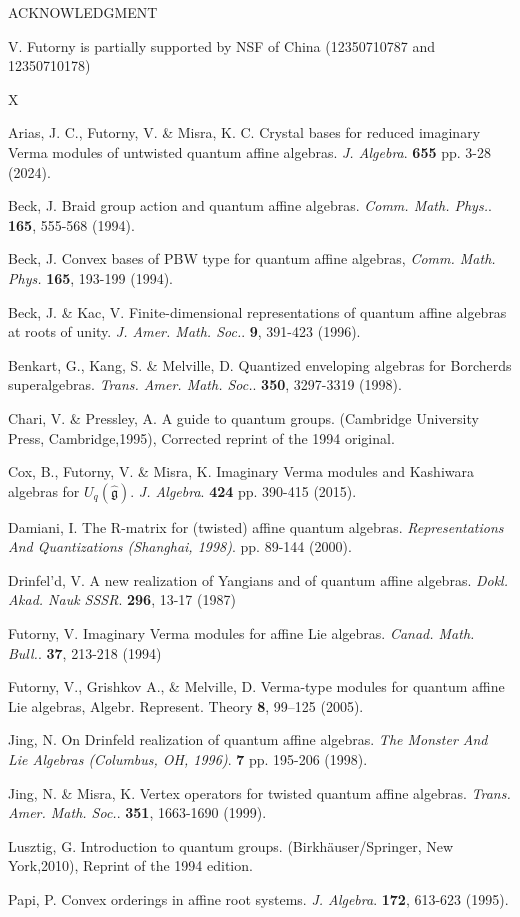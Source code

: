 \documentclass[12pt]{amsart}
\numberwithin{equation}{section}
\begin{document}
\bigskip
\begin{center}
ACKNOWLEDGMENT
\end{center}
\smallskip
 V. Futorny is partially supported by NSF of China (12350710787 and 12350710178)


\begin{thebibliography}{X}

 Arias, J. C., Futorny, V. \& Misra, K. C. Crystal bases for reduced imaginary Verma modules of untwisted quantum affine algebras. {\em J. Algebra}. \textbf{655} pp. 3-28 (2024).

Beck, J. Braid group action and quantum affine algebras. {\em Comm. Math. Phys.}. \textbf{165}, 555-568 (1994).

 Beck, J. Convex bases of PBW type for quantum affine algebras, {\em Comm. Math. Phys.} {\bf 165}, 193-199 (1994).

 Beck, J. \& Kac, V. Finite-dimensional representations of quantum affine algebras at roots of unity. {\em J. Amer. Math. Soc.}. \textbf{9}, 391-423 (1996).

 Benkart, G., Kang, S. \& Melville, D. Quantized enveloping algebras for Borcherds superalgebras. {\em Trans. Amer. Math. Soc.}. \textbf{350}, 3297-3319 (1998).

Chari, V. \& Pressley, A. A guide to quantum groups. (Cambridge University Press, Cambridge,1995), Corrected reprint of the 1994 original.

Cox, B., Futorny, V. \& Misra, K. Imaginary {V}erma modules and {K}ashiwara algebras for  {$U_q(\hat{\mathfrak{g}})$}. {\em J. Algebra}. \textbf{424} pp. 390-415 (2015).

 Damiani, I. The R-matrix for (twisted) affine quantum algebras. {\em Representations And Quantizations (Shanghai, 1998)}. pp. 89-144 (2000).

Drinfel'd, V. A new realization of Yangians and of quantum affine algebras. {\em Dokl. Akad. Nauk SSSR}. \textbf{296}, 13-17 (1987)

Futorny, V. Imaginary Verma modules for affine Lie algebras. {\em Canad. Math. Bull.}. \textbf{37}, 213-218 (1994)

 Futorny, V., Grishkov A., \& Melville, D. Verma-type modules for quantum affine Lie algebras, Algebr. Represent. Theory {\bf 8}, 99--125 (2005).

 Jing, N. On Drinfeld realization of quantum affine algebras. {\em The Monster And Lie Algebras (Columbus, OH, 1996)}. \textbf{7} pp. 195-206 (1998).

 Jing, N. \& Misra, K. Vertex operators for twisted quantum affine algebras. {\em Trans. Amer. Math. Soc.}. \textbf{351}, 1663-1690 (1999).

 Lusztig, G. Introduction to quantum groups. (Birkh\"auser/Springer, New York,2010), Reprint of the 1994 edition.

 Papi, P. Convex orderings in affine root systems. {\em J. Algebra}. \textbf{172}, 613-623 (1995).



\end{thebibliography}
\end{document}
